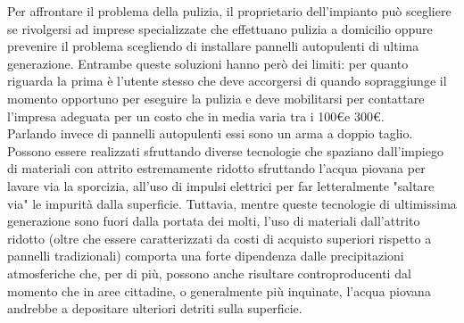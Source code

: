 \documentclass[a4paper, 12pt]{article}
\begin{document}
	Per affrontare il problema della pulizia, il proprietario dell'impianto può scegliere se rivolgersi ad imprese specializzate che effettuano pulizia a domicilio oppure prevenire il problema scegliendo di installare pannelli autopulenti di ultima generazione. Entrambe queste soluzioni hanno però dei limiti: per quanto riguarda la prima è l'utente stesso che deve accorgersi di quando sopraggiunge il momento opportuno per eseguire la pulizia e deve mobilitarsi per contattare l'impresa adeguata per un costo che in media varia tra i 100\euro e 300\euro.\\
	Parlando invece di pannelli autopulenti essi sono un arma a doppio taglio.\\
 Possono essere realizzati sfruttando diverse tecnologie che spaziano dall'impiego di materiali con attrito estremamente ridotto sfruttando l'acqua piovana per lavare via la sporcizia, all'uso di impulsi elettrici per far letteralmente "saltare via" le impurità dalla superficie. Tuttavia, mentre queste tecnologie di ultimissima generazione sono fuori dalla portata dei molti, l'uso di materiali dall'attrito ridotto (oltre che essere caratterizzati da costi di acquisto superiori rispetto  a pannelli tradizionali) comporta una forte dipendenza dalle precipitazioni atmosferiche che, per di più, possono anche risultare controproducenti dal momento che in aree cittadine, o generalmente più inquinate, l'acqua piovana andrebbe a depositare ulteriori detriti sulla superficie.\\
\end{document}
